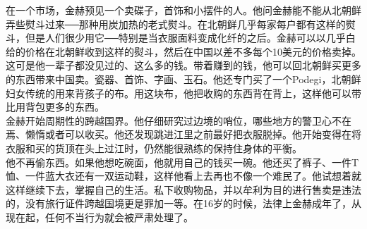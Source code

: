 在一个市场，金赫预见一个卖碟子，首饰和小摆件的人。他问金赫能不能从北朝鲜弄些熨斗过来──那种用炭加热的老式熨斗。在北朝鲜几乎每家每户都有这样的熨斗，但是人们很少用它──特别是当衣服面料变成化纤的之后。金赫可以以几乎白给的价格在北朝鲜收到这样的熨斗，然后在中国以差不多每个10美元的价格卖掉。这可是他一辈子都没见过的、这么多的钱。带着赚到的钱，他可以回北朝鲜买更多的东西带来中国卖。瓷器、首饰、字画、玉石。他还专门买了一个Podegi，北朝鲜妇女传统的用来背孩子的布。用这块布，他把收购的东西背在背上，这样他可以带比用背包更多的东西。\\

金赫开始周期性的跨越国界。他仔细研究过边境的哨位，哪些地方的警卫心不在焉、懒惰或者可以收买。他还发现跳进江里之前最好把衣服脱掉。他开始变得在将衣服和买的货顶在头上过江时，仍然能很熟练的保持住身体的平衡。\\

他不再偷东西。如果他想吃碗面，他就用自己的钱买一碗。他还买了裤子、一件T恤、一件蓝大衣还有一双运动鞋，这样他看上去再也不像一个难民了。他试想着就这样继续下去，掌握自己的生活。私下收购物品，并以牟利为目的进行售卖是违法的，没有旅行证件跨越国境更是罪加一等。在16岁的时候，法律上金赫成年了，从现在起，任何不当行为就会被严肃处理了。\\
